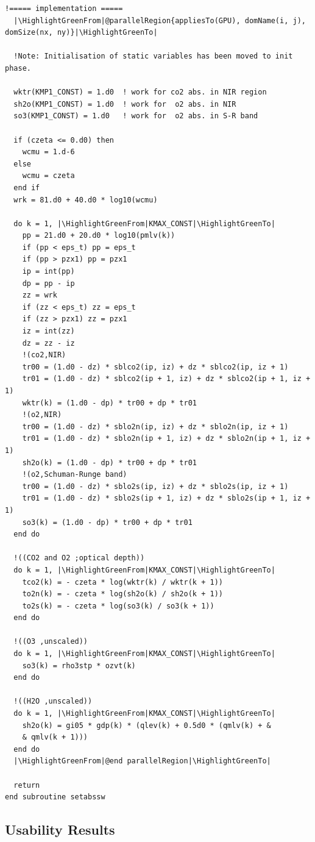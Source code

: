 \begin{lstlisting}[firstnumber=1, name=absswHybrid, label=listing:absswHybrid, caption={Example ASUCA kernel subroutine in Hybrid Fortran}, escapechar=|]
  !===== implementation =====
  |\HighlightGreenFrom|@parallelRegion{appliesTo(GPU), domName(i, j), domSize(nx, ny)}|\HighlightGreenTo|

  !Note: Initialisation of static variables has been moved to init phase.

  wktr(KMP1_CONST) = 1.d0  ! work for co2 abs. in NIR region
  sh2o(KMP1_CONST) = 1.d0  ! work for  o2 abs. in NIR
  so3(KMP1_CONST) = 1.d0   ! work for  o2 abs. in S-R band

  if (czeta <= 0.d0) then
    wcmu = 1.d-6
  else
    wcmu = czeta
  end if
  wrk = 81.d0 + 40.d0 * log10(wcmu)

  do k = 1, |\HighlightGreenFrom|KMAX_CONST|\HighlightGreenTo|
    pp = 21.d0 + 20.d0 * log10(pmlv(k))
    if (pp < eps_t) pp = eps_t
    if (pp > pzx1) pp = pzx1
    ip = int(pp)
    dp = pp - ip
    zz = wrk
    if (zz < eps_t) zz = eps_t
    if (zz > pzx1) zz = pzx1
    iz = int(zz)
    dz = zz - iz
    !(co2,NIR)
    tr00 = (1.d0 - dz) * sblco2(ip, iz) + dz * sblco2(ip, iz + 1)
    tr01 = (1.d0 - dz) * sblco2(ip + 1, iz) + dz * sblco2(ip + 1, iz + 1)
    wktr(k) = (1.d0 - dp) * tr00 + dp * tr01
    !(o2,NIR)
    tr00 = (1.d0 - dz) * sblo2n(ip, iz) + dz * sblo2n(ip, iz + 1)
    tr01 = (1.d0 - dz) * sblo2n(ip + 1, iz) + dz * sblo2n(ip + 1, iz + 1)
    sh2o(k) = (1.d0 - dp) * tr00 + dp * tr01
    !(o2,Schuman-Runge band)
    tr00 = (1.d0 - dz) * sblo2s(ip, iz) + dz * sblo2s(ip, iz + 1)
    tr01 = (1.d0 - dz) * sblo2s(ip + 1, iz) + dz * sblo2s(ip + 1, iz + 1)
    so3(k) = (1.d0 - dp) * tr00 + dp * tr01
  end do

  !((CO2 and O2 ;optical depth))
  do k = 1, |\HighlightGreenFrom|KMAX_CONST|\HighlightGreenTo|
    tco2(k) = - czeta * log(wktr(k) / wktr(k + 1))
    to2n(k) = - czeta * log(sh2o(k) / sh2o(k + 1))
    to2s(k) = - czeta * log(so3(k) / so3(k + 1))
  end do

  !((O3 ,unscaled))
  do k = 1, |\HighlightGreenFrom|KMAX_CONST|\HighlightGreenTo|
    so3(k) = rho3stp * ozvt(k)
  end do

  !((H2O ,unscaled))
  do k = 1, |\HighlightGreenFrom|KMAX_CONST|\HighlightGreenTo|
    sh2o(k) = gi05 * gdp(k) * (qlev(k) + 0.5d0 * (qmlv(k) + &
    & qmlv(k + 1)))
  end do
  |\HighlightGreenFrom|@end parallelRegion|\HighlightGreenTo|

  return
end subroutine setabssw
\end{lstlisting}

\subsection{Usability Results}

